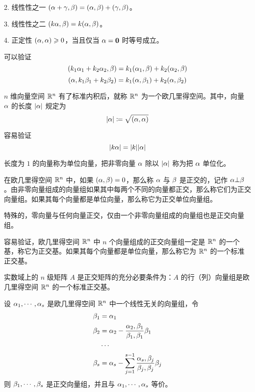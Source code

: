 2. 线性性之一 $(\alpha+\gamma,\beta) = (\alpha,\beta) + (\gamma,\beta)$。

3. 线性性之二 $(k\alpha,\beta) = k(\alpha,\beta)$。

4. 正定性 $(\alpha,\alpha)\geqslant 0$，当且仅当 $\alpha=\boldsymbol{0}$ 时等号成立。

可以验证
\[(k_1\alpha_1+k_2\alpha_2,\beta) = k_1(\alpha_1,\beta) + k_2(\alpha_2,\beta)\]
\[(\alpha,k_1\beta_1+k_2\beta_2) = k_1(\alpha,\beta_1) + k_2(\alpha,\beta_2)\]

$n$ 维向量空间 $\mathbb{R}^n$ 有了标准内积后，就称 $\mathbb{R}^n$ 为一个欧几里得空间。其中，向量 $\alpha$ 的长度 $|\alpha|$ 规定为
\[|\alpha| \coloneqq  \sqrt{(\alpha,\alpha)}\]

容易验证
\[|k\alpha| = |k||\alpha|\]

长度为 $1$ 的向量称为单位向量，把非零向量 $\alpha$ 除以 $|\alpha|$ 称为把 $\alpha$ 单位化。

在欧几里得空间 $\mathbb{R}^n$ 中，如果 $(\alpha,\beta)=0$，那么称 $\alpha$ 与 $\beta$ 是正交的，记作 $\alpha \bot \beta$。由非零向量组成的向量组如果其中每两个不同的向量都正交，那么称它们为正交向量组。如果其每个向量都是单位向量，那么称它为正交单位向量组。

特殊的，零向量与任何向量正交，仅由一个非零向量组成的向量组也是正交向量组。

容易验证，欧几里得空间 $\mathbb{R}^n$ 中 $n$ 个向量组成的正交向量组一定是 $\mathbb{R}^n$ 的一个基，称它为正交基。如果其每个向量都是单位向量，那么称它为 $\mathbb{R}^n$ 的一个标准正交基。

\begin{theorem}
    实数域上的 $n$ 级矩阵 $A$ 是正交矩阵的充分必要条件为：$A$ 的行（列）向量组是欧几里得空间 $\mathbb{R}^n$ 的一个标准正交基。
\end{theorem}

\begin{theorem}
    设 $\alpha_1,\cdots,\alpha_s$ 是欧几里得空间 $\mathbb{R}^n$ 中一个线性无关的向量组，令
    \begin{equation*}
        \begin{aligned}
            \beta_1&=\alpha_1\\
            \beta_2&=\alpha_2 - \frac{\alpha_2,\beta_1}{\beta_1,\beta_1}\beta_1\\
            &\cdots \\
            \beta_s &= \alpha_s-\sum_{j=1}^{s-1}\frac{\alpha_s,\beta_j}{\beta_j,\beta_j}\beta_j
        \end{aligned}
    \end{equation*}
    则 $\beta_1,\cdots,\beta_s$ 是正交向量组，并且与 $\alpha_1,\cdots,\alpha_s$ 等价。
\end{theorem}

